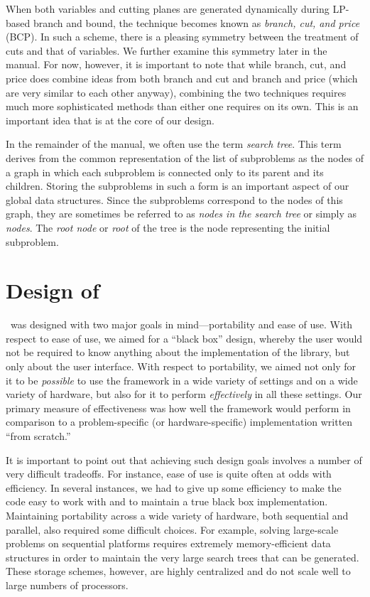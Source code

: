 When both variables and cutting planes are generated dynamically
during LP-based branch and bound, the technique becomes known as {\em
branch, cut, and price} (BCP). In such a scheme, there is a pleasing
symmetry between the treatment of cuts and that of variables. We
further examine this symmetry later in the manual. For
now, however, it is important to note that while branch, cut, and
price does combine ideas from both branch and cut and branch and price
(which are very similar to each other anyway), combining the two
techniques requires much more sophisticated methods than either one
requires on its own. This is an important idea that is at the core of
our design.

In the remainder of the manual, we often use the term {\em search
tree}. This term derives from the common representation of the list of
subproblems as the nodes of a graph in which each subproblem is
connected only to its parent and its children. Storing the subproblems
in such a form is an important aspect of our global data structures.
Since the subproblems correspond to the nodes of this graph, they are
sometimes be referred to as {\em nodes in the search tree} or simply
as {\em nodes}. The {\em root node} or {\em root} of the tree is the
node representing the initial subproblem.

\section{Design of \BB}
\label{design}

\BB\ was designed with two major goals in mind---portability and
ease of use. With respect to ease of use, we aimed for a ``black box''
design, whereby the user would not be required to know anything about
the implementation of the library, but only about the user interface.
With respect to portability, we aimed not only for it to be {\em
possible} to use the framework in a wide variety of settings and on a
wide variety of hardware, but also for it to perform {\em effectively} in all
these settings. Our primary measure of effectiveness was
how well the framework would perform in comparison to a problem-specific
(or hardware-specific) implementation written ``from scratch.''

It is important to point out that achieving such design goals involves
a number of very difficult tradeoffs. For instance, ease of use is quite
often at odds with efficiency. In several instances, we had to give up
some efficiency to make the code easy to work with and to maintain a
true black box implementation. Maintaining portability across a wide
variety of hardware, both sequential and parallel, also required some
difficult choices. For example, solving large-scale problems on
sequential platforms requires extremely memory-efficient data
structures in order to maintain the very large search trees that can
be generated. These storage schemes, however, are highly centralized
and do not scale well to large numbers of processors. 

